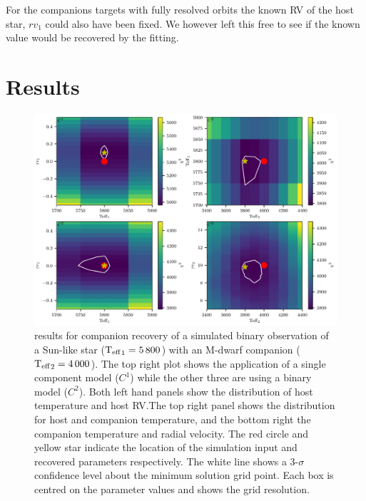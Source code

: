 For the companions targets with fully resolved orbits the known {RV} of the host star, \({rv}_1\) could also have been fixed.
We however left this free to see if the known value would be recovered by the fitting.







\section{Results}
\label{sec:chi2_results}




\begin{figure}
    \centering
    \includegraphics[width=0.7\linewidth]{figures/companion_recovery/Mdwarf_pcolors}
    \caption{\textchisquared{} results for companion recovery of a simulated binary observation of a Sun-like star (\({\textrm{T}_{\mathrm{eff}}}_{1}=5\,800\)\K{}) with an M-dwarf companion (\({\textrm{T}_{\mathrm{eff}}}_{2}=4\,000\)\K{}).
The top right plot shows the application of a single component model (\(C^1\)) while the other three are using a binary model (\(C^2\)).
Both left hand panels show the distribution of host temperature and host {RV}.\@ The top right panel shows the distribution for host and companion temperature, and the bottom right the companion temperature and radial velocity.
    The red circle and yellow star indicate the location of the simulation input and recovered parameters respectively.
    The white line shows a 3-\(\sigma\) confidence level about the minimum \textchisquared{} solution grid point.
Each box is centred on the parameter values and shows the grid resolution.}
    \label{fig:Mdwarf_contours}
\end{figure}

